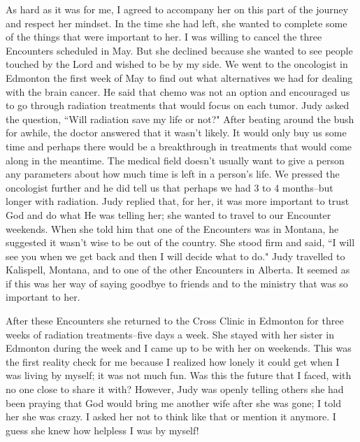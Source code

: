 \documentclass[oneside,12pt]{book}
\begin{document}
As hard as it was for me, I agreed to accompany her on this part of the journey and respect her mindset. In the time she had left, she wanted to complete some of the things that were important to her. I was willing to cancel the three Encounters scheduled in May. But she declined because she wanted to see people touched by the Lord and wished to be by my side. We went to the oncologist in Edmonton the first week of May to find out what alternatives we had for dealing with the brain cancer. He said that chemo was not an option and encouraged us to go through radiation treatments that would focus on each tumor. Judy asked the question, ``Will radiation save my life or not?" After beating around the bush for awhile, the doctor answered that it wasn't likely. It would only buy us some time and perhaps there would be a breakthrough in treatments that would come along in the meantime. The medical field doesn't usually want to give a person any parameters about how much time is left in a person's life. We pressed the oncologist further and he did tell us that perhaps we had 3 to 4 months--but longer with radiation. Judy replied that, for her, it was more important to trust God and do what He was telling her; she wanted to travel to our Encounter weekends. When she told him that one of the Encounters was in Montana, he suggested it wasn't wise to be out of the country. She stood firm and said, ``I will see you when we get back and then I will decide what to do." Judy travelled to Kalispell, Montana, and to one of the other Encounters in Alberta. It seemed as if this was her way of saying goodbye to friends and to the ministry that was so important to her. 

After these Encounters she returned to the Cross Clinic in Edmonton for three weeks of radiation treatments--five days a week. She stayed with her sister in Edmonton during the week and I came up to be with her on weekends. This was the first reality check for me because I realized how lonely it could get when I was living by myself; it was not much fun. Was this the future that I faced, with no one close to share it with? However, Judy was openly telling others she had been praying that God would bring me another wife after she was gone; I told her she was crazy. I asked her not to think like that or mention it anymore. I guess she knew how helpless I was by myself!
\end{document}
